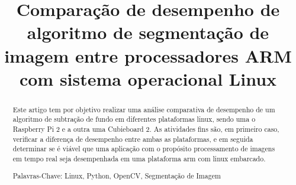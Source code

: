 \documentclass[conference]{IEEEtran}
\begin{document}
%
\title{Comparação de desempenho de algoritmo de segmentação de imagem entre processadores ARM com sistema operacional Linux}


\author{

}

\maketitle

\begin{abstract}
Este artigo tem por objetivo realizar uma análise comparativa de desempenho de um algoritmo de subtração de fundo em diferentes plataformas linux, sendo uma o Raspberry Pi 2 e a outra uma Cubieboard 2. As atividades fins são, em primeiro caso, verificar a diferença de desempenho entre ambas as plataformas, e em seguida determinar se é viável que uma aplicação com o propósito processamento de imagens em tempo real seja desempenhada em uma plataforma arm com linux embarcado.

Palavras-Chave: Linux, Python, OpenCV, Segmentação de Imagem
\end{abstract}
\end{document}
